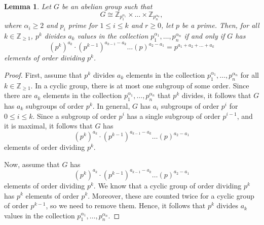 \documentclass[a4paper, openany]{memoir}
\theoremstyle{definition}
\theoremstyle{plain}
\newtheorem{lemma}[definition]{Lemma}
\begin{document}
    \begin{lemma}
        Let $G$ be an abelian group such that
        \[G \cong \mathbb{Z}_{p_1^{\alpha_1}} \times \dots \times \mathbb{Z}_{p_n^{\alpha_ n}},\]
        where $\alpha_i \geq 2$ and $p_i$ prime for $1 \leq i \leq k$ and $r \geq 0$, let $p$ be a prime. Then, for all $k \in \mathbb{Z}_{\geq 1}$, $p^k$ divides $a_k$ values in the collection $p_1^{\alpha_1}, \dots, p_n^{\alpha_n}$ if and only if $G$ has 
        \[(p^k)^{a_k} \cdot (p^{k-1})^{a_{k-1} - a_k} \dots (p)^{a_2 - a_1} = p^{a_1 + a_2 + \dots + a_k}\]
        elements of order dividing $p^k$.
    \end{lemma}
    \begin{proof}
        First, assume that $p^k$ divides $a_k$ elements in the collection $p_1^{\alpha_1}, \dots, p_n^{\alpha_n}$ for all $k \in \mathbb{Z}_{\geq 1}$. In a cyclic group, there is at most one subgroup of some order. Since there are $a_k$ elements in the collection $p_1^{\alpha_1}, \dots, p_n^{\alpha_n}$ that $p^k$ divides, it follows that $G$ has $a_k$ subgroups of order $p^k$. In general, $G$ has $a_i$ subgroups of order $p^i$ for $0 \leq i \leq k$. Since a subgroup of order $p^i$ has a single subgroup of order $p^{i-1}$, and it is maximal, it follows that $G$ has 
        \[(p^k)^{a_k} \cdot (p^{k-1})^{a_{k-1} - a_k} \dots (p)^{a_2 - a_1}\]
        elements of order dividing $p^k$.


        Now, assume that $G$ has 
        \[(p^k)^{a_k} \cdot (p^{k-1})^{a_{k-1} - a_k} \dots (p)^{a_2 - a_1}\]
        elements of order dividing $p^k$. We know that a cyclic group of order dividing $p^k$ has $p^k$ elements of order $p^k$. Moreover, these are counted twice for a cyclic group of order $p^{k-1}$, so we need to remove them. Hence, it follows that $p^k$ divides $a_k$ values in the collection $p_1^{\alpha_1}, \dots, p_n^{\alpha_n}$.

    \end{proof}
\end{document}
